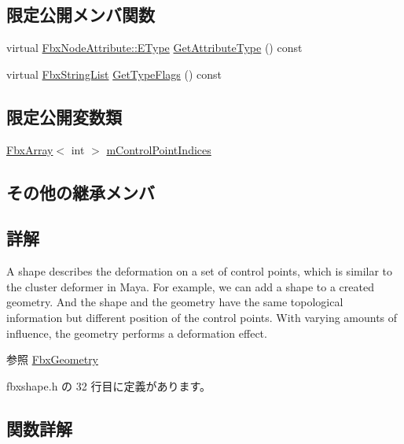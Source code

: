 \subsection*{限定公開メンバ関数}
\begin{DoxyCompactItemize}
\item 
virtual \hyperlink{class_fbx_node_attribute_a08e1669d3d1a696910756ab17de56d6a}{Fbx\+Node\+Attribute\+::\+E\+Type} \hyperlink{class_fbx_shape_a976141cda408244bd89c44c7a6b22d4b}{Get\+Attribute\+Type} () const
\item 
virtual \hyperlink{class_fbx_string_list}{Fbx\+String\+List} \hyperlink{class_fbx_shape_a36129584616ab648435077244d6e6dbf}{Get\+Type\+Flags} () const
\end{DoxyCompactItemize}
\subsection*{限定公開変数類}
\begin{DoxyCompactItemize}
\item 
\hyperlink{class_fbx_array}{Fbx\+Array}$<$ int $>$ \hyperlink{class_fbx_shape_ae27b2ace894858d90213f44ebe3f23a1}{m\+Control\+Point\+Indices}
\end{DoxyCompactItemize}
\subsection*{その他の継承メンバ}


\subsection{詳解}
A shape describes the deformation on a set of control points, which is similar to the cluster deformer in Maya. For example, we can add a shape to a created geometry. And the shape and the geometry have the same topological information but different position of the control points. With varying amounts of influence, the geometry performs a deformation effect.

\begin{DoxySeeAlso}{参照}
\hyperlink{class_fbx_geometry}{Fbx\+Geometry} 
\end{DoxySeeAlso}


 fbxshape.\+h の 32 行目に定義があります。



\subsection{関数詳解}
\mbox{\label{class_fbx_shape_ac64fb6d8fc185a698a7c982805538e47}} 
